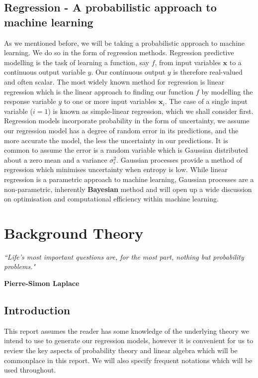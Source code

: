 \documentclass[10pt,a4paper]{article}
\numberwithin{equation}{section}
\theoremstyle{plain}
\theoremstyle{definition}
\theoremstyle{own}
\begin{document}
\subsection*{Regression - A probabilistic approach to machine learning}
As we mentioned before, we will be taking a probabilistic approach to machine learning. We do so in the form of regression methods. Regression predictive modelling is the task of learning a function, say $f$, from input variables $\mathbf{x}$ to a continuous output variable $y$. Our continuous output $y$ is therefore real-valued and often scalar. The most widely known method for regression is linear regression which is the linear approach to finding our function $f$ by modelling the response variable $y$ to one or more input variables $\mathbf{x}_i$. The case of a single input variable ($i = 1$) is known as simple-linear regression, which we shall consider first. Regression models incorporate probability in the form of uncertainty, we assume our regression model has a degree of random error in its predictions, and the more accurate the model, the less the uncertainty in our predictions. It is common to assume the error is a random variable which is Gaussian distributed about a zero mean and a variance $\sigma_\epsilon^2$. Gaussian processes provide a method of regression which minimises uncertainty when entropy is low. While linear regression is a parametric approach to machine learning, Gaussian processes are a non-parametric, inherently \textbf{Bayesian} method and will open up a wide discussion on optimisation and computational efficiency within machine learning.
\pagebreak
\section{Background Theory}
\epigraph{\textit{``Life's most important questions are, for the most part, nothing but probability problems."}}{\textbf{Pierre-Simon Laplace}}
\subsection{Introduction}
This report assumes the reader has some knowledge of the underlying theory we intend to use to generate our regression models, however it is convenient for us to review the key aspects of probability theory and linear algebra which will be commonplace in this report. We will also specify frequent notations which will be used throughout.
\end{document}
